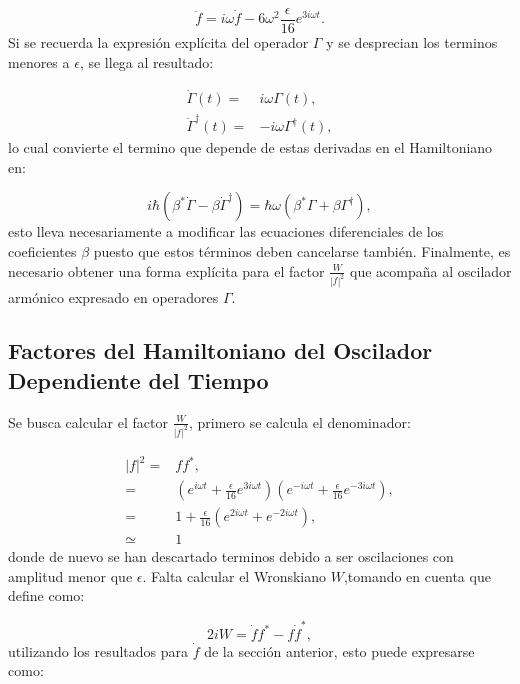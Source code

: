 \documentclass[a4paper,10pt]{report}
\begin{document}
\begin{equation}
\ddot{f} = i\omega\dot{f} - 6\omega^2\frac{\epsilon}{16} e^{3i\omega t}.
\end{equation}Si se recuerda la expresión explícita del operador $\Gamma$ y se desprecian los terminos menores a $\epsilon$, se llega al resultado:

\begin{align}
\dot{\Gamma}(t) =& i\omega \Gamma(t),\\
\dot{\Gamma}^\dagger(t) =& -i\omega \Gamma^\dagger(t),
\end{align} lo cual convierte el termino que depende de estas derivadas en el Hamiltoniano en:

\begin{equation}
i\hbar(\beta^*\dot{\Gamma}-\beta\dot{\Gamma}^\dagger) = \hbar\omega(\beta^*\Gamma+\beta\Gamma^{\dagger}),
\end{equation} esto lleva necesariamente a modificar las ecuaciones diferenciales de los coeficientes $\beta$ puesto que estos términos deben cancelarse también. Finalmente, es necesario obtener una forma explícita para el factor $\frac{W}{|f|^2}$ que acompaña al oscilador armónico expresado en operadores $\Gamma$.

\subsection{Factores del Hamiltoniano del Oscilador Dependiente del Tiempo}

Se busca calcular el factor $\frac{W}{|f|^2}$, primero se calcula el denominador:

\begin{align*}
|f|^2=&ff^*,\\
=& (e^{i\omega t} + \frac{\epsilon}{16} e^{3i\omega t})(e^{-i\omega t} + \frac{\epsilon}{16} e^{-3i\omega t}),\\
=& 1+\frac{\epsilon}{16}(e^{2i\omega t}+e^{-2i\omega t}),\\
\simeq & 1
\end{align*} donde de nuevo se han descartado terminos debido a ser oscilaciones con amplitud menor que $\epsilon$. Falta calcular el Wronskiano $W$,tomando en cuenta que \cite{BrownPT} define como:

\begin{equation}
2iW = \dot{f}f^* - f\dot{f}^*,
\end{equation} utilizando los resultados para $\dot{f}$ de la sección anterior, esto puede expresarse como:
\end{document}
